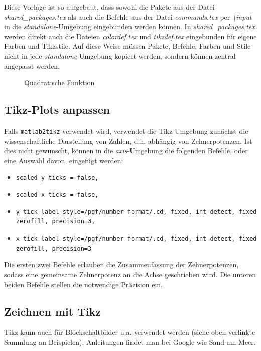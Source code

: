 Diese Vorlage ist so aufgebaut, dass sowohl die Pakete aus der Datei \textit{shared\_packages.tex} als auch die Befehle aus der Datei \textit{commands.tex} per \textit{\textbackslash input} in die \textit{standalone}-Umgebung eingebunden werden können.
In \textit{shared\_packages.tex} werden direkt auch die Dateien \textit{colordef.tex} und \textit{tikzdef.tex} eingebunden für eigene Farben und Tikzstile. 
Auf diese Weise müssen Pakete, Befehle, Farben und Stile nicht in jede \textit{standalone}-Umgebung kopiert werden, sondern können zentral angepasst werden.

\begin{figure}[h]
	\centering
	
	\caption{Quadratische Funktion}
	\label{fig:tikz:x_square}
\end{figure}


\subsection{Tikz-Plots anpassen}

Falls \texttt{matlab2tikz} verwendet wird, verwendet die Tikz-Umgebung zunächst die wissenschaftliche Darstellung von Zahlen, d.h. abhängig von Zehnerpotenzen.
Ist dies nicht gewünscht, können in die \textit{axis}-Umgebung die folgenden Befehle, oder eine Auswahl davon, eingefügt werden:

\begin{itemize}
         \item \texttt{scaled y ticks = false,} 
         \item \texttt{scaled x ticks = false,}
         \item \texttt{y tick label style={/pgf/number format/.cd, fixed, int detect, fixed zerofill, precision=3},}
         \item \texttt{x tick label style={/pgf/number format/.cd, fixed, int detect, fixed zerofill, precision=3}}
\end{itemize}

Die ersten zwei Befehle erlauben die Zusammenfassung der Zehnerpotenzen, sodass eine gemeinsame Zehnerpotenz an die Achse geschrieben wird.
Die unteren beiden Befehle stellen die notwendige Präzision ein.


\subsection{Zeichnen mit Tikz}

Tikz kann auch für Blockschaltbilder u.a. verwendet werden (siehe oben verlinkte Sammlung an Beispielen).
Anleitungen findet man bei Google wie Sand am Meer.

